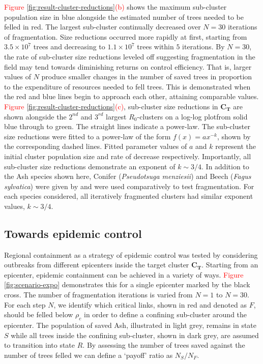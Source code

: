 \textcolor{red}{Figure \ref{fig:result-cluster-reductions}(b)} shows the maximum sub-cluster population size in blue alongside the estimated number of trees needed to be felled in red. The largest sub-cluster continually decreased over $N=30$ iterations of fragmentation. Size reductions occurred more rapidly at first, starting from $\mathrm{3.5\times 10^7}$ trees and decreasing to $\mathrm{1.1\times 10^7}$ trees within $5$ iterations. By $N=30$, the rate of sub-cluster size reductions leveled off suggesting fragmentation in the field may tend towards diminishing returns on control efficiency. That is, larger values of $N$ produce smaller changes in the number of saved trees in proportion to the expenditure of resources needed to fell trees. This is demonstrated when the red and blue lines begin to approach each other, attaining comparable values.\\ 

\textcolor{red}{Figure \ref{fig:result-cluster-reductions}(c)}, sub-cluster size reductions in $\mathbf{C_T}$ are shown alongside the $2^{nd}$ and $3^{rd}$ largest $R_0$-clusters on a log-log plot\textemdash from solid blue through to green. The straight lines indicate a power-law. The sub-cluster size reductions were fitted to a power-law of the form $f(x) = ax^{-k}$, shown by the corresponding dashed lines. Fitted parameter values of $a$ and $k$ represent the initial cluster population size and rate of decrease respectively. Importantly, all sub-cluster size reductions demonstrate an exponent of $k\sim 3/4$. In addition to the Ash species shown here, Conifer (\textit{Pseudotsuga menziesii}) and Beech (\textit{Fagus sylvatica}) were given by \cite{hill.data} and were used comparatively to test fragmentation. For each species considered, all iteratively fragmented clusters had similar exponent values, $k\sim 3/4$.\\


\subsection{Towards epidemic control}
Regional containment as a strategy of epidemic control was tested by considering outbreaks from different epicenters inside the target cluster $\mathbf{C_T}$. Starting from an epicenter, epidemic containment can be achieved in a variety of ways. \textcolor{red}{Figure \ref{fig:scenario-expo}} demonstrates this for a single epicenter marked by the black cross. The number of fragmentation iterations is varied from $N=1$ to $N=30$. For each step $N$, we identify which critical links, shown in red and denoted as $F$, should be felled below $\rho_c$ in order to define a confining sub-cluster around the epicenter. The population of saved Ash, illustrated in light grey, remains in state $S$ while all trees inside the confining sub-cluster, shown in dark grey, are assumed to transition into state $R$. By assessing the number of trees saved against the number of trees felled we can define a `payoff' ratio as $N_S/N_F$.\\

